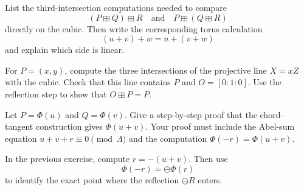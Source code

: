 \begin{exercise}
List the third-intersection computations needed to compare
\[
  (P\boxplus Q)\boxplus R
  \quad\text{and}\quad
  P\boxplus(Q\boxplus R)
\]
directly on the cubic.  Then write the corresponding torus calculation
\[
  (u+v)+w=u+(v+w)
\]
and explain which side is linear.
\end{exercise}

\begin{exercise}
For \(P=(x,y)\), compute the three intersections of the projective line
\(X=xZ\) with the cubic.  Check that this line contains \(P\) and
\(O=[0:1:0]\).  Use the reflection step to show that \(O\boxplus P=P\).
\end{exercise}

\begin{exercise}
Let \(P=\Phi(u)\) and \(Q=\Phi(v)\).  Give a step-by-step proof that the
chord--tangent construction gives \(\Phi(u+v)\).  Your proof must include the
Abel-sum equation \(u+v+r\equiv0\pmod{\Lambda}\) and the computation
\(\Phi(-r)=\Phi(u+v)\).
\end{exercise}

\begin{exercise}
In the previous exercise, compute \(r=-(u+v)\).  Then use
\[
  \Phi(-r)=\ominus\Phi(r)
\]
to identify the exact point where the reflection \(\ominus R\) enters.
\end{exercise}

